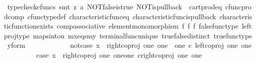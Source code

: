 \begin{isabellebody}
\ {\isacharparenleft}{\kern0pt}typecheck{\isacharunderscore}{\kern0pt}cfuncs{\isacharcomma}{\kern0pt}\ smt\ {\isacharparenleft}{\kern0pt}z{}{\isacharparenright}{\kern0pt}\ a{}\ NOT{\isacharunderscore}{\kern0pt}false{\isacharunderscore}{\kern0pt}is{\isacharunderscore}{\kern0pt}true\ NOT{\isacharunderscore}{\kern0pt}is{\isacharunderscore}{\kern0pt}pullback\ \ cart{\isacharunderscore}{\kern0pt}prod{\isacharunderscore}{\kern0pt}eq{}\ cfunc{\isacharunderscore}{\kern0pt}prod{\isacharunderscore}{\kern0pt}comp\ cfunc{\isacharunderscore}{\kern0pt}type{\isacharunderscore}{\kern0pt}def\ characteristic{\isacharunderscore}{\kern0pt}func{\isacharunderscore}{\kern0pt}eq\ characteristic{\isacharunderscore}{\kern0pt}func{\isacharunderscore}{\kern0pt}is{\isacharunderscore}{\kern0pt}pullback\ characteristic{\isacharunderscore}{\kern0pt}function{\isacharunderscore}{\kern0pt}exists\ comp{\isacharunderscore}{\kern0pt}associative\ element{\isacharunderscore}{\kern0pt}monomorphism\ f{}\ f{}\ f{}\ false{\isacharunderscore}{\kern0pt}func{\isacharunderscore}{\kern0pt}type\ left{\isacharunderscore}{\kern0pt}proj{\isacharunderscore}{\kern0pt}type\ maps{\isacharunderscore}{\kern0pt}into{\isacharunderscore}{\kern0pt}{}u{}\ mx{\isacharunderscore}{\kern0pt}eqs{\isacharunderscore}{\kern0pt}my\ terminal{\isacharunderscore}{\kern0pt}func{\isacharunderscore}{\kern0pt}unique\ true{\isacharunderscore}{\kern0pt}false{\isacharunderscore}{\kern0pt}distinct\ true{\isacharunderscore}{\kern0pt}func{\isacharunderscore}{\kern0pt}type\ y{\isacharunderscore}{\kern0pt}form{\isacharparenright}{\kern0pt}\isanewline
\ \ \ \ \isamarkupfalse%
\isanewline
\ \ \ \ \ \ \isamarkupfalse%
\ not{\isacharunderscore}{\kern0pt}case{}{\isacharcolon}{\kern0pt}\ {\isachardoublequoteopen}x\ {\isasymnoteq}\ right{\isacharunderscore}{\kern0pt}coproj\ one\ {\isacharparenleft}{\kern0pt}one\ {\isasymCoprod}\ one{\isacharparenright}{\kern0pt}\ {\isasymcirc}\isactrlsub c\ left{\isacharunderscore}{\kern0pt}coproj\ one\ one{\isachardoublequoteclose}\isanewline
\ \ \ \ \ \ \isamarkupfalse%
\ \isamarkupfalse%
\ case{}{\isacharcolon}{\kern0pt}\ {\isachardoublequoteopen}x\ {\isacharequal}{\kern0pt}\ right{\isacharunderscore}{\kern0pt}coproj\ one\ {\isacharparenleft}{\kern0pt}one{\isasymCoprod}one{\isacharparenright}{\kern0pt}\ {\isasymcirc}\isactrlsub c{\isacharparenleft}{\kern0pt}right{\isacharunderscore}{\kern0pt}coproj\ one\ one{\isacharparenright}{\kern0pt}{\isachardoublequoteclose}\isanewline

\end{isabellebody}
